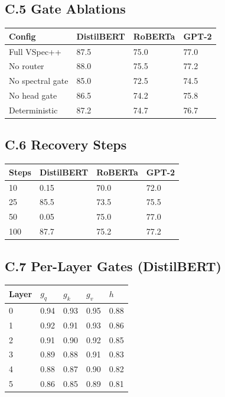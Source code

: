 \subsection{C.5 Gate Ablations}

\begin{table}[H]
\centering
\small
\begin{tabular}{llll}
\toprule
\textbf{Config} & \textbf{DistilBERT} & \textbf{RoBERTa} & \textbf{GPT-2} \\
\midrule
Full VSpec++ & 87.5 & 75.0 & 77.0 \\
No router & 88.0 & 75.5 & 77.2 \\
No spectral gate & 85.0 & 72.5 & 74.5 \\
No head gate & 86.5 & 74.2 & 75.8 \\
Deterministic & 87.2 & 74.7 & 76.7 \\
\bottomrule
\end{tabular}
\end{table}

\subsection{C.6 Recovery Steps}

\begin{table}[H]
\centering
\small
\begin{tabular}{llll}
\toprule
\textbf{Steps} & \textbf{DistilBERT} & \textbf{RoBERTa} & \textbf{GPT-2} \\
\midrule
10 & 0.15 & 70.0 & 72.0 \\
25 & 85.5 & 73.5 & 75.5 \\
50 & 0.05 & 75.0 & 77.0 \\
100 & 87.7 & 75.2 & 77.2 \\
\bottomrule
\end{tabular}
\end{table}

\subsection{C.7 Per-Layer Gates (DistilBERT)}

\begin{table}[H]
\centering
\small
\begin{tabular}{lllll}
\toprule
\textbf{Layer} & \textbf{$g_q$} & \textbf{$g_k$} & \textbf{$g_v$} & \textbf{$h$} \\
\midrule
0 & 0.94 & 0.93 & 0.95 & 0.88 \\
1 & 0.92 & 0.91 & 0.93 & 0.86 \\
2 & 0.91 & 0.90 & 0.92 & 0.85 \\
3 & 0.89 & 0.88 & 0.91 & 0.83 \\
4 & 0.88 & 0.87 & 0.90 & 0.82 \\
5 & 0.86 & 0.85 & 0.89 & 0.81 \\
\bottomrule
\end{tabular}
\end{table}

